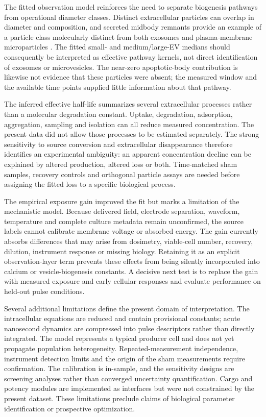 The fitted observation model reinforces the need to separate biogenesis pathways from operational diameter classes. Distinct extracellular particles can overlap in diameter and composition, and secreted midbody remnants provide an example of a particle class molecularly distinct from both exosomes and plasma-membrane microparticles \cite{peterman2021midbody}. The fitted small- and medium/large-EV medians should consequently be interpreted as effective pathway kernels, not direct identification of exosomes or microvesicles. The near-zero apoptotic-body contribution is likewise not evidence that these particles were absent; the measured window and the available time points supplied little information about that pathway.

The inferred effective half-life summarizes several extracellular processes rather than a molecular degradation constant. Uptake, degradation, adsorption, aggregation, sampling and isolation can all reduce measured concentration. The present data did not allow those processes to be estimated separately. The strong sensitivity to source conversion and extracellular disappearance therefore identifies an experimental ambiguity: an apparent concentration decline can be explained by altered production, altered loss or both. Time-matched sham samples, recovery controls and orthogonal particle assays are needed before assigning the fitted loss to a specific biological process.

The empirical exposure gain improved the fit but marks a limitation of the mechanistic model. Because delivered field, electrode separation, waveform, temperature and complete culture metadata remain unconfirmed, the source labels cannot calibrate membrane voltage or absorbed energy. The gain currently absorbs differences that may arise from dosimetry, viable-cell number, recovery, dilution, instrument response or missing biology. Retaining it as an explicit observation-layer term prevents these effects from being silently incorporated into calcium or vesicle-biogenesis constants. A decisive next test is to replace the gain with measured exposure and early cellular responses and evaluate performance on held-out pulse conditions.

Several additional limitations define the present domain of interpretation. The intracellular equations are reduced and contain provisional constants; acute nanosecond dynamics are compressed into pulse descriptors rather than directly integrated. The model represents a typical producer cell and does not yet propagate population heterogeneity. Repeated-measurement independence, instrument detection limits and the origin of the sham measurements require confirmation. The calibration is in-sample, and the sensitivity designs are screening analyses rather than converged uncertainty quantification. Cargo and potency modules are implemented as interfaces but were not constrained by the present dataset. These limitations preclude claims of biological parameter identification or prospective optimization.

